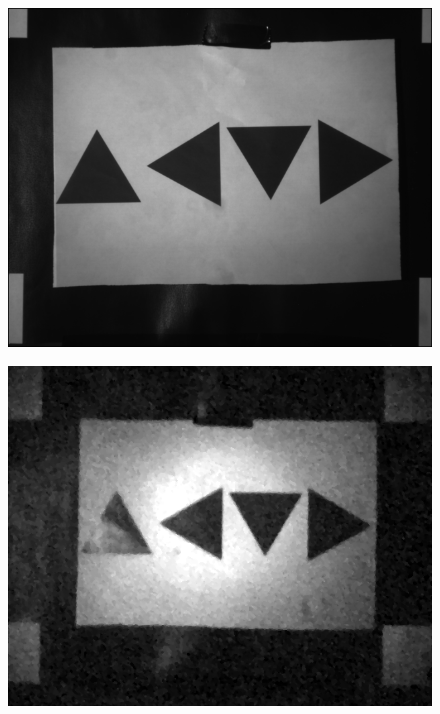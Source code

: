\begin{figure}[H]
    \centering
\begin{minipage}[t]{0.45\textwidth}
    \includegraphics[width=1\textwidth]{result/mtf/swir2.png}
    \subcaption{}
    \label{fig:mtf_s2}
\end{minipage}
\begin{minipage}[t]{0.45\textwidth}
    \includegraphics[width=1\textwidth]{result/mtf/spc22.png}
    \subcaption{}
    \label{fig:mtf_spc2}
\end{minipage}
\begin{minipage}[t]{0.45\textwidth}

\end{minipage}
\end{figure}
